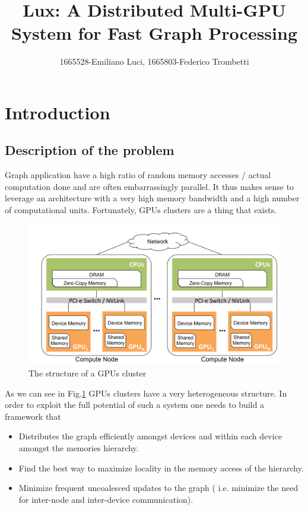 \documentclass[]{article}
\title{Lux: A Distributed Multi-GPU System for Fast Graph Processing}
\author{1665528-Emiliano Luci, 1665803-Federico Trombetti}
\begin{document}
\maketitle

\section{Introduction}
\subsection{Description of the problem}
Graph application have a high ratio of random memory accesses / actual computation done and are often embarrassingly parallel. It thus makes sense to leverage an architecture with a very high memory bandwidth and a high number of computational units. Fortunately, GPUs clusters are a thing that exists. 

\begin{figure}[H]

	\centering
	\includegraphics[width=0.7\linewidth]{gpu_cluster.png}
	\caption{The structure of a GPUs cluster}
	\label{fig:gpu_cluster}
\end{figure}

As we can see in Fig.\ref{fig:gpu_cluster} GPUs clusters have a very heterogeneous structure. In order to exploit the full potential of such a system one needs to build a framework that
\begin{itemize}
	\item Distributes the graph efficiently amongst devices and within each device amongst the memories hierarchy.
	\item Find the best way to maximize locality in the memory access of the hierarchy.
	\item Minimize frequent uncoalesced updates to the graph ( i.e. minimize the need for inter-node and inter-device communication).
\end{itemize}
\end{document}
